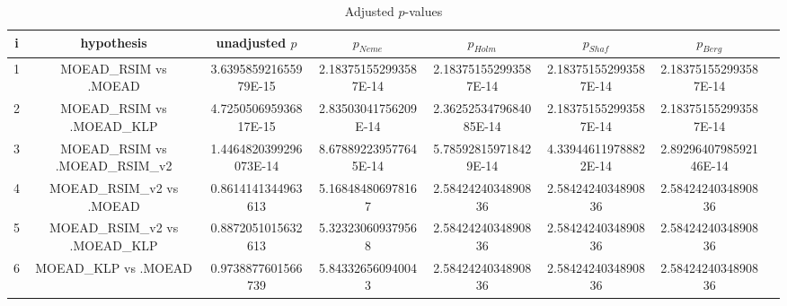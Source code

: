 \documentclass[a4paper,10pt]{article}
\begin{document}
\begin{landscape}
\begin{table}[!htp]
\centering\tiny
\caption{Adjusted $p$-values}
\begin{tabular}{cccccccc}
i&hypothesis&unadjusted $p$&$p_{Neme}$&$p_{Holm}$&$p_{Shaf}$&$p_{Berg}$\\
\hline
1&MOEAD_RSIM vs .MOEAD&3.639585921655979E-15&2.183751552993587E-14&2.183751552993587E-14&2.183751552993587E-14&2.183751552993587E-14\\
2&MOEAD_RSIM vs .MOEAD_KLP&4.725050695936817E-15&2.83503041756209E-14&2.3625253479684085E-14&2.183751552993587E-14&2.183751552993587E-14\\
3&MOEAD_RSIM vs .MOEAD_RSIM_v2&1.4464820399296073E-14&8.678892239577645E-14&5.785928159718429E-14&4.339446119788822E-14&2.8929640798592146E-14\\
4&MOEAD_RSIM_v2 vs .MOEAD&0.8614141344963613&5.168484806978167&2.5842424034890836&2.5842424034890836&2.5842424034890836\\
5&MOEAD_RSIM_v2 vs .MOEAD_KLP&0.8872051015632613&5.323230609379568&2.5842424034890836&2.5842424034890836&2.5842424034890836\\
6&MOEAD_KLP vs .MOEAD&0.9738877601566739&5.843326560940043&2.5842424034890836&2.5842424034890836&2.5842424034890836\\
\hline
\end{tabular}
\end{table}

\end{landscape}
\end{document}
